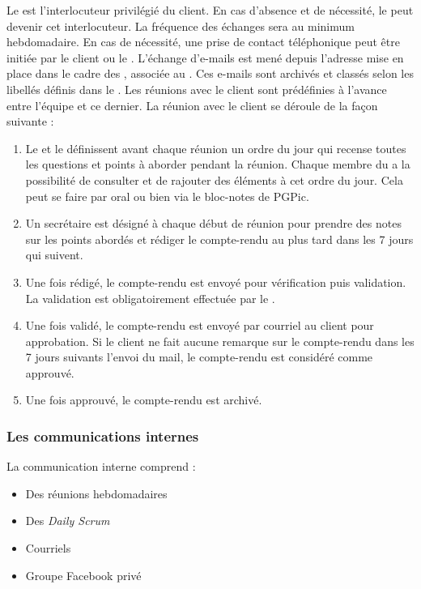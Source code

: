 Le \CP{} est l’interlocuteur privilégié du client. En cas d’absence et de nécessité, le \CPA{} peut devenir cet interlocuteur. La fréquence des échanges sera au minimum hebdomadaire. En cas de nécessité, une prise de contact téléphonique peut être initiée par
le client ou le \CP. L’échange d’e-mails est mené depuis l’adresse mise en place dans le cadre des \PICCourt, associée au \CP. Ces e-mails sont archivés et classés selon les libellés définis dans le \PGC. Les réunions avec le client sont prédéfinies à l’avance entre l’équipe \PICCourt et ce dernier. La réunion avec le client se déroule de la façon suivante :
\begin{enumerate}
\item Le \CP{} et le \CPA{} définissent avant chaque réunion un ordre du jour qui recense toutes les questions et points à aborder pendant la réunion. Chaque membre du \PICCourt a la possibilité de consulter et de rajouter des éléments à cet ordre du jour. Cela peut se faire par oral ou bien via le bloc-notes de PGPic.
\item Un secrétaire est désigné à chaque début de réunion pour prendre des notes sur les points abordés et rédiger le compte-rendu au plus tard dans les 7 jours qui suivent.
\item Une fois rédigé, le compte-rendu est envoyé pour vérification puis validation. La validation est obligatoirement effectuée par le \CP.
\item Une fois validé, le compte-rendu est envoyé par courriel au client pour approbation. Si le client ne fait aucune remarque sur le compte-rendu dans les 7 jours suivants l’envoi du mail, le compte-rendu est considéré comme approuvé.
\item Une fois approuvé, le compte-rendu est archivé.
\end{enumerate}


\subsubsection*{Les communications internes}

La communication interne comprend :
\begin{itemize}
\item Des réunions hebdomadaires
\item Des \textit{Daily Scrum}
\item Courriels
\item Groupe Facebook privé \\
\end{itemize}

